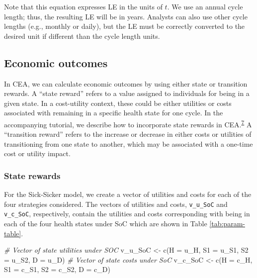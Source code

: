 \documentclass[
]{article}
\newenvironment{Shaded}{\begin{snugshade}}{\end{snugshade}}
\newcommand{\AttributeTok}[1]{\textcolor[rgb]{0.77,0.63,0.00}{#1}}
\newcommand{\CommentTok}[1]{\textcolor[rgb]{0.56,0.35,0.01}{\textit{#1}}}
\newcommand{\FunctionTok}[1]{\textcolor[rgb]{0.00,0.00,0.00}{#1}}
\newcommand{\NormalTok}[1]{#1}
\newcommand{\OtherTok}[1]{\textcolor[rgb]{0.56,0.35,0.01}{#1}}
\begin{document}
Note that this equation expresses LE in the units of \(t\). We use an annual cycle length; thus, the resulting LE will be in years. Analysts can also use other cycle lengths (e.g., monthly or daily), but the LE must be correctly converted to the desired unit if different than the cycle length units.

\hypertarget{economic-outcomes}{%
\subsection{Economic outcomes}\label{economic-outcomes}}

In CEA, we can calculate economic outcomes by using either state or transition rewards. A ``state reward'' refers to a value assigned to individuals for being in a given state. In a cost-utility context, these could be either utilities or costs associated with remaining in a specific health state for one cycle. In the accompanying tutorial, we describe how to incorporate state rewards in CEA.\textsuperscript{\protect\hyperlink{ref-Alarid-Escudero2021a}{7}} A ``transition reward'' refers to the increase or decrease in either costs or utilities of transitioning from one state to another, which may be associated with a one-time cost or utility impact.

\hypertarget{state-rewards}{%
\subsubsection{State rewards}\label{state-rewards}}

For the Sick-Sicker model, we create a vector of utilities and costs for each of the four strategies considered. The vectors of utilities and costs, \texttt{v\_u\_SoC} and \texttt{v\_c\_SoC}, respectively, contain the utilities and costs corresponding with being in each of the four health states under SoC which are shown in Table \ref{tab:param-table}.

\begin{Shaded}
\begin{Highlighting}[]
\CommentTok{\# Vector of state utilities under SOC}
\NormalTok{v\_u\_SoC }\OtherTok{\textless{}{-}} \FunctionTok{c}\NormalTok{(}\AttributeTok{H =}\NormalTok{ u\_H, }\AttributeTok{S1 =}\NormalTok{ u\_S1, }\AttributeTok{S2 =}\NormalTok{ u\_S2, }\AttributeTok{D =}\NormalTok{ u\_D)}
\CommentTok{\# Vector of state costs under SoC}
\NormalTok{v\_c\_SoC }\OtherTok{\textless{}{-}} \FunctionTok{c}\NormalTok{(}\AttributeTok{H =}\NormalTok{ c\_H, }\AttributeTok{S1 =}\NormalTok{ c\_S1, }\AttributeTok{S2 =}\NormalTok{ c\_S2, }\AttributeTok{D =}\NormalTok{ c\_D)}
\end{Highlighting}
\end{Shaded}
\end{document}
